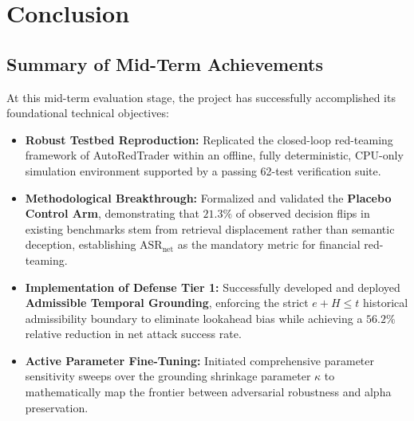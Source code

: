 \documentclass[11pt,a4paper]{article}
\begin{document}
\section{Conclusion}
\label{sec:conclusion}

\subsection{Summary of Mid-Term Achievements}
At this mid-term evaluation stage, the project has successfully accomplished its foundational technical objectives:
\begin{itemize}
    \item \textbf{Robust Testbed Reproduction:} Replicated the closed-loop red-teaming framework of AutoRedTrader within an offline, fully deterministic, CPU-only simulation environment supported by a passing 62-test verification suite.
    \item \textbf{Methodological Breakthrough:} Formalized and validated the \textbf{Placebo Control Arm}, demonstrating that $21.3\%$ of observed decision flips in existing benchmarks stem from retrieval displacement rather than semantic deception, establishing $\text{ASR}_{\text{net}}$ as the mandatory metric for financial red-teaming.
    \item \textbf{Implementation of Defense Tier 1:} Successfully developed and deployed \textbf{Admissible Temporal Grounding}, enforcing the strict $e + H \le t$ historical admissibility boundary to eliminate lookahead bias while achieving a $56.2\%$ relative reduction in net attack success rate.
    \item \textbf{Active Parameter Fine-Tuning:} Initiated comprehensive parameter sensitivity sweeps over the grounding shrinkage parameter $\kappa$ to mathematically map the frontier between adversarial robustness and alpha preservation.
\end{itemize}
\end{document}

